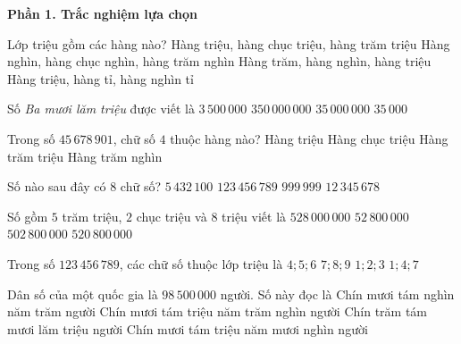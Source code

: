 \textbf{Phần 1. Trắc nghiệm lựa chọn}

\begin{ex} %
Lớp triệu gồm các hàng nào?
\choice
{\True Hàng triệu, hàng chục triệu, hàng trăm triệu}
{Hàng nghìn, hàng chục nghìn, hàng trăm nghìn}
{Hàng trăm, hàng nghìn, hàng triệu}
{Hàng triệu, hàng tỉ, hàng nghìn tỉ}
\end{ex}

\begin{ex} %
Số \textit{Ba mươi lăm triệu} được viết là
\choice
{$3\,500\,000$}
{$350\,000\,000$}
{\True $35\,000\,000$}
{$35\,000$}
\end{ex}

\begin{ex} %
Trong số $45\,678\,901$, chữ số $4$ thuộc hàng nào?
\choice
{Hàng triệu}
{\True Hàng chục triệu}
{Hàng trăm triệu}
{Hàng trăm nghìn}
\end{ex}

\begin{ex} %
Số nào sau đây có 8 chữ số?
\choice
{$5\,432\,100$}
{$123\,456\,789$}
{$999\,999$}
{\True $12\,345\,678$}
\end{ex}

\begin{ex} %
Số gồm $5$ trăm triệu, $2$ chục triệu và $8$ triệu viết là
\choice
{\True $528\,000\,000$}
{$52\,800\,000$}
{$502\,800\,000$}
{$520\,800\,000$}
\end{ex}

\begin{ex} %
Trong số $123\,456\,789$, các chữ số thuộc lớp triệu là
\choice
{$4; 5; 6$}
{$7; 8; 9$}
{\True $1; 2; 3$}
{$1; 4; 7$}
\end{ex}

\begin{ex} %
Dân số của một quốc gia là $98\,500\,000$ người. Số này đọc là
\choice
{Chín mươi tám nghìn năm trăm người}
{\True Chín mươi tám triệu năm trăm nghìn người}
{Chín trăm tám mươi lăm triệu người}
{Chín mươi tám triệu năm mươi nghìn người}
\end{ex}

